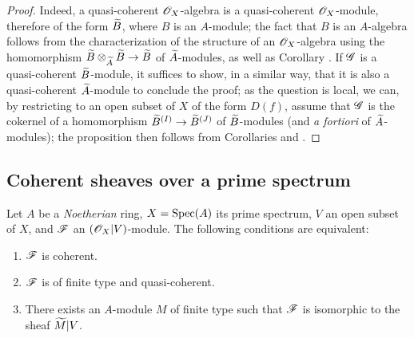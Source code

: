 \begin{proof}
\label{proof-1.1.4.3}
Indeed, a quasi-coherent $\mathscr{O}_X$-algebra is a quasi-coherent $\mathscr{O}_X$-module, therefore of the
form $\widetilde{B}$, where $B$ is an $A$-module; the fact that $B$ is an $A$-algebra
follows from the characterization of the structure of an $\mathscr{O}_X$-algebra using the
homomorphism $\widetilde{B}\otimes_{\widetilde{A}}\widetilde{B}\to\widetilde{B}$ of
$\widetilde{A}$-modules, as well as Corollary . If $\mathscr{G}$ is a quasi-coherent
$\widetilde{B}$-module, it suffices to show, in a similar way,
that it is also a quasi-coherent $\widetilde{A}$-module to conclude the proof; as the
question is local, we can, by restricting to an open subset of $X$ of the form $D(f)$, assume
that $\mathscr{G}$ is the cokernel of a homomorphism $\widetilde{B}^{(I)}\to\widetilde{B}^{(J)}$
of $\widetilde{B}$-modules (and \emph{a fortiori} of $\widetilde{A}$-modules); the
proposition then follows from Corollaries  and .
\end{proof}

\subsection{Coherent sheaves over a prime spectrum}
\label{subsection-coh-over-spec}

\begin{thm}[1.5.1]
\label{1.1.5.1}
Let $A$ be a \emph{Noetherian} ring, $X={\mathop{\mathrm{Spec}}\nolimits}(A)$ its prime spectrum, $V$ an open subset of
$X$, and $\mathscr{F}$ an $(\mathscr{O}_X|V)$-module. The following conditions are equivalent:
\begin{enumerate}[label=\emph{(\alph*)}]
  \item $\mathscr{F}$ is coherent.
  \item $\mathscr{F}$ is of finite type and quasi-coherent.
  \item There exists an $A$-module $M$ of finite type such that $\mathscr{F}$ is isomorphic to the sheaf $\widetilde{M}|V$.
\end{enumerate}
\end{thm}


